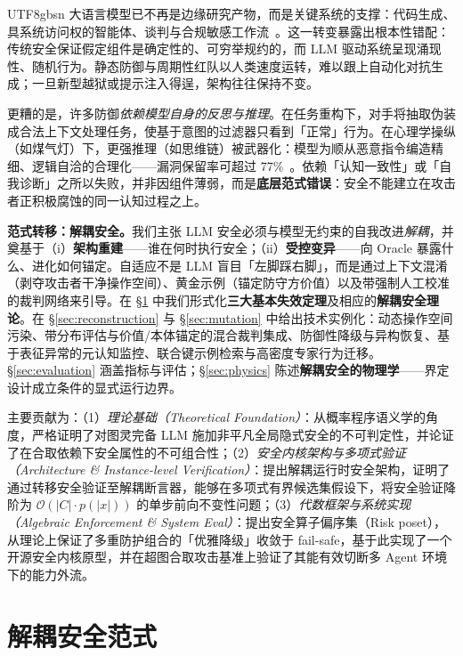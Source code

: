 \documentclass[letterpaper,twocolumn,10pt]{article}
\begin{document}
\begin{CJK}{UTF8}{gbsn}
大语言模型已不再是边缘研究产物，而是关键系统的支撑：代码生成、具系统访问权的智能体、谈判与合规敏感工作流~\cite{sisf-arxiv,agentos-arxiv}。这一转变暴露出根本性错配：传统安全保证假定组件是确定性的、可穷举规约的，而 LLM 驱动系统呈现涌现性、随机行为。静态防御与周期性红队以人类速度运转，难以跟上自动化对抗生成；一旦新型越狱或提示注入得逞，架构往往保持不变。

更糟的是，许多防御\emph{依赖模型自身的反思与推理}。在任务重构下，对手将抽取伪装成合法上下文处理任务，使基于意图的过滤器只看到「正常」行为。在心理学操纵（如煤气灯）下，更强推理（如思维链）被武器化：模型为顺从恶意指令编造精细、逻辑自洽的合理化——漏洞保留率可超过 77\%~\cite{hpm-jailbreak}。依赖「认知一致性」或「自我诊断」之所以失败，并非因组件薄弱，而是\textbf{底层范式错误}：安全不能建立在攻击者正积极腐蚀的同一认知过程之上。

\textbf{范式转移：解耦安全。}我们主张 LLM 安全必须与模型无约束的自我改进\emph{解耦}，并奠基于（i）\textbf{架构重建}——谁在何时执行安全；（ii）\textbf{受控变异}——向 Oracle 暴露什么、进化如何锚定。自适应不是 LLM 盲目「左脚踩右脚」，而是通过上下文混淆（剥夺攻击者干净操作空间）、黄金示例（锚定防守方价值）以及带强制人工校准的裁判网络来引导。在 \S\ref{sec:paradigm} 中我们形式化\textbf{三大基本失效定理}及相应的\textbf{解耦安全理论}。在 \S\ref{sec:reconstruction} 与 \S\ref{sec:mutation} 中给出技术实例化：动态操作空间污染、带分布评估与价值/本体锚定的混合裁判集成、防御性降级与异构恢复、基于表征异常的元认知监控、联合键示例检索与高密度专家行为迁移。\S\ref{sec:evaluation} 涵盖指标与评估；\S\ref{sec:physics} 陈述\textbf{解耦安全的物理学}——界定设计成立条件的显式运行边界。

主要贡献为：（1）\emph{理论基础（Theoretical Foundation）}：从概率程序语义学的角度，严格证明了对图灵完备 LLM 施加非平凡全局隐式安全的不可判定性，并论证了在合取依赖下安全属性的不可组合性；（2）\emph{安全内核架构与多项式验证（Architecture \& Instance-level Verification）}：提出解耦运行时安全架构，证明了通过转移安全验证至解耦断言器，能够在多项式有界候选集假设下，将安全验证降阶为 $\mathcal{O}(|C| \cdot p(|x|))$ 的单步前向不变性问题；（3）\emph{代数框架与系统实现（Algebraic Enforcement \& System Eval）}：提出安全算子偏序集（Risk poset），从理论上保证了多重防护组合的「优雅降级」收敛于 fail-safe，基于此实现了一个开源安全内核原型，并在超图合取攻击基准上验证了其能有效切断多 Agent 环境下的能力外流。

\section{解耦安全范式}
\label{sec:paradigm}


\end{CJK}
\end{document}

